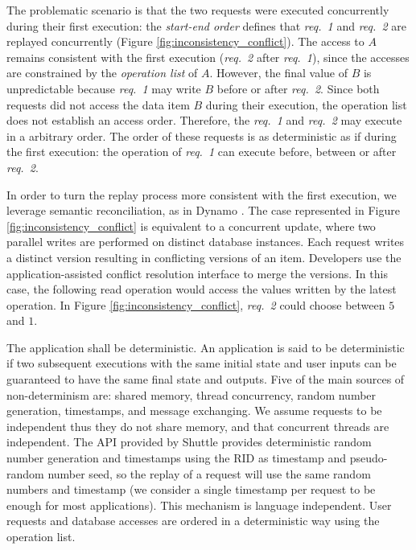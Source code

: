 The problematic scenario is that the two requests were executed concurrently during their first execution: the \emph{start-end order} defines that \emph{req.~1} and \emph{req.~2} are replayed concurrently (Figure \ref{fig:inconsistency_conflict}). The access to $A$ remains consistent with the first execution (\emph{req.~2} after \emph{req.~1}), since the accesses are constrained by the \emph{operation list} of $A$. However, the final value of $B$ is unpredictable because \emph{req.~1} may write $B$ before or after \emph{req.~2}. Since both requests did not access the data item $B$ during their execution, the operation list does not establish an access order. Therefore, the \emph{req.~1} and \emph{req.~2} may execute in a arbitrary order. The order of these requests is as deterministic as if during the first execution: the operation of \emph{req.~1} can execute before, between or after \emph{req.~2}.

In order to turn the replay process more consistent with the first execution, we leverage semantic reconciliation, as in Dynamo \cite{Decandia2007}. The case represented in Figure \ref{fig:inconsistency_conflict} is equivalent to a concurrent update, where two parallel writes are performed on distinct database instances. Each request writes a distinct version resulting in conflicting versions of an item. Developers use the application-assisted conflict resolution interface to merge the versions. In this case, the following read operation would access the values written by the latest operation. In Figure \ref{fig:inconsistency_conflict}, \emph{req.~2} could choose between $5$ and $1$.

The application shall be deterministic. An application is said to be deterministic if two subsequent executions with the same initial state and user inputs can be guaranteed to have the same final state and outputs. Five of the main sources of non-determinism are: shared memory, thread concurrency, random number generation, timestamps, and message exchanging. We assume requests to be independent thus they do not share memory, and that concurrent threads are independent. The API provided by Shuttle provides deterministic random number generation and timestamps using the \acf{RID} as timestamp and pseudo-random number seed, so the replay of a request will use the same random numbers and timestamp (we consider a single timestamp per request to be enough for most applications). This mechanism is language independent. User requests and database accesses are ordered in a deterministic way using the operation list.


